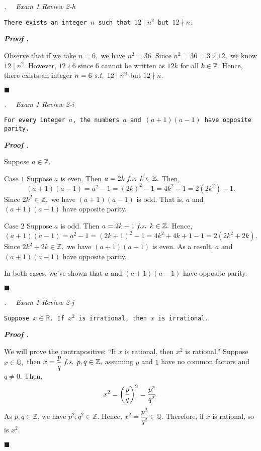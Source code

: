 \documentclass[11pt,letter]{article}
\newcounter{nq}[section]
\newcounter{np}[section]
\newenvironment*{p}{\par\noindent\textbf{\textit{Proof \stepcounter{np}\thenp. }}\par}{\par\hfill $\blacksquare$\par}
\newenvironment*{q}[1]{\noindent\emph{\thesection.\stepcounter{nq}\thenq$\quad $ #1}\par\noindent\texttt}{}
\def\Z{{\mathbb{Z}}}
\def\R{{\mathbb{R}}}
\def\Q{{\mathbb{Q}}}
\def\st{\emph{ s.t. }}
\def\fs{\emph{ f.s. }}
\begin{document}
\begin{framed}\begin{q}
	{Exam 1 Review 2-h}
	{There exists an integer $n$ such that $12\mid n^2$ but $12\nmid n$.}
\end{q}\end{framed}
\begin{p}
	Observe that if we take $n=6,$ we have $n^2=36$. Since $n^2=36=3\times12,$ we know $12\mid n^2.$ However, $12\nmid6$ since $6$ cannot be written as $12k$ for all $k\in\Z.$ Hence, there exists an integer $n=6\st12\mid n^2$ but $12\nmid n$.
\end{p}

\begin{framed}\begin{q}
	{Exam 1 Review 2-i}
	{For every integer $a$, the numbers $a$ and $(a+1)(a-1)$ have opposite parity.}
\end{q}\end{framed}
\begin{p}
	Suppose $a\in\Z.$\par
	$\boxed{\text{Case }1}$ Suppose $a$ is even. Then $a=2k\fs k\in\Z.$ Then, \[(a+1)(a-1)=a^2-1=(2k)^2-1=4k^2-1=2(2k^2)-1.\] Since $2k^2\in\Z,$ we have $(a+1)(a-1)$ is odd. That is, $a$ and $(a+1)(a-1)$ have opposite parity.\par
	$\boxed{\text{Case 2}}$ Suppose $a$ is odd. Then $a=2k+1\fs k\in\Z.$ Hence, \[(a+1)(a-1)=a^2-1=(2k+1)^2-1=4k^2+4k+1-1=2(2k^2+2k).\] Since $2k^2+2k\in\Z,$ we have $(a+1)(a-1)$ is even. As a result, $a$ and $(a+1)(a-1)$ have opposite parity.\par 
	In both cases, we've shown that $a$ and $(a+1)(a-1)$ have opposite parity.
\end{p}

\begin{framed}\begin{q}
	{Exam 1 Review 2-j}
	{Suppose $x\in\R$. If $x^2$ is irrational, then $x$ is irrational.}
\end{q}\end{framed}
\begin{p}
	We will prove the contrapositive: ``If $x$ is rational, then $x^2$ is rational.'' Suppose $x\in\Q,$ then $x=\dfrac{p}{q}\fs p,q\in\Z,$ assuming $p$ and $1$ have no common factors and $q\neq0$. Then, \[x^2=\qty(\dfrac{p}{q})^2=\dfrac{p^2}{q^2}.\] As $p,q\in\Z$, we have $p^2,q^2\in\Z.$ Hence, $x^2=\dfrac{p^2}{q^2}\in\Q.$ Therefore, if $x$ is rational, so is $x^2$.	
\end{p}
\end{document}
